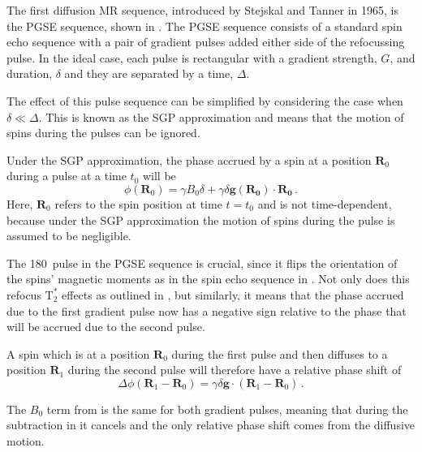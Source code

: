 The first diffusion MR sequence, introduced by Stejskal and Tanner in 1965\cite{Stejskal1965}, is the \acf{PGSE} sequence, shown in .
The PGSE sequence consists of a standard spin echo sequence with a pair of gradient pulses added either side of the refocussing pulse.
In the ideal case, each pulse is rectangular with a gradient strength, $G$, and duration, $\delta$ and they are separated by a time, $\Delta$.  

The effect of this pulse sequence can be simplified by considering the case when $\delta \ll \Delta$. This is known as the \ac{SGP} approximation and means that the motion of spins during the pulses can be ignored. 

Under the \ac{SGP} approximation, the phase accrued by a spin at a position $\mathbf{R}_0$ during a pulse at a time $t_0$ will be
\begin{equation}
  \phi(\mathbf{R}_0) = \gamma B_0\delta +  \gamma \delta \mathbf{g(R_0)}\cdot\mathbf{R_0}\,.
  \label{eq:phi_single_SGP}
\end{equation}
Here, $\mathbf{R}_0$ refers to the spin position at time $t=t_0$ and is not time-dependent, because under the SGP approximation the motion of spins during the pulse is assumed to be negligible. 

The 180\degree\ pulse in the \ac{PGSE} sequence is crucial, since it flips the orientation of the spins' magnetic moments as in the spin echo sequence in .
Not only does this refocus $\mathrm{T}_2^*$ effects as outlined in , but similarly, it means that the phase accrued due to the first gradient pulse now has a negative sign relative to the phase that will be accrued due to the second pulse. %

A spin which is at a position $\mathbf{R}_0$ during the first pulse and then diffuses to a position $\mathbf{R}_1$ during the second pulse will therefore have a relative phase shift of 
\begin{equation}
  \Delta\phi(\mathbf{R}_1 - \mathbf{R}_0) = \gamma\delta\mathbf{g} \cdot \left(\mathbf{R}_1 - \mathbf{R}_0\right)\,.
  \label{eq:delta_phi}
\end{equation}

The $B_0$ term from  is the same for both gradient pulses, meaning that during the subtraction in  it cancels and the only relative phase shift comes from the diffusive motion.

